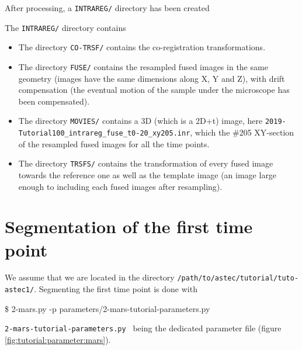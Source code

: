 After processing, a \texttt{INTRAREG/} directory has been created

\mbox{}
\mbox{}

The \texttt{INTRAREG/} directory contains

\mbox{}
\mbox{}

\begin{itemize}
\itemsep -1ex
\item The directory \texttt{CO-TRSF/} contains the co-registration
  transformations.
\item The directory \texttt{FUSE/} contains the resampled fused images
  in the same geometry (images have the same dimensions along X, Y and
  Z), with drift compensation (the eventual motion of the sample under the
  microscope has been compensated). 
\item The directory \texttt{MOVIES/} contains a 3D (which is a 2D+t)
  image, here
  \texttt{2019-Tutorial100\_intrareg\_fuse\_t0-20\_xy205.inr}, which
  the \#205 XY-section of the resampled fused images for all the time
  points.
\item The directory \texttt{TRSFS/}  contains the transformation of
  every fused image towards the reference one as well as the template
  image (an image large enough to including each fused images after
  resampling).
\end{itemize}





\section{Segmentation of the first time point}


We assume that we are located in the directory
\texttt{/path/to/astec/tutorial/tuto-astec1/}. Segmenting the first
time point is
done with
\begin{code}{0.8}
  \$ 2-mars.py -p parameters/2-mars-tutorial-parameters.py 
\end{code}
\texttt{2-mars-tutorial-parameters.py } being the
dedicated parameter file  (figure \ref{fig:tutorial:parameter:mars}).

